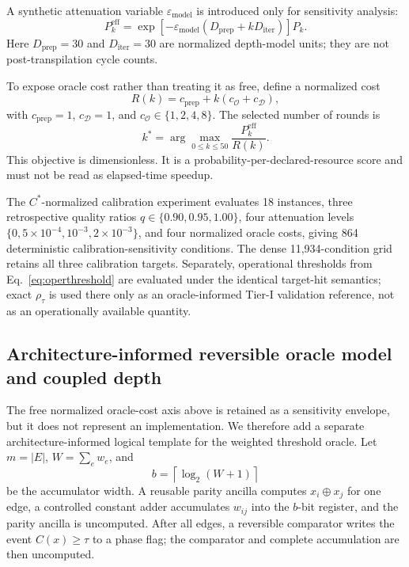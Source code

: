 \documentclass[5p,times]{elsarticle}
\begin{document}
A synthetic attenuation variable $\varepsilon_{\mathrm{model}}$ is introduced only for sensitivity analysis:
\begin{equation}
P_k^{\mathrm{eff}}=
\exp\left[-\varepsilon_{\mathrm{model}}(D_{\mathrm{prep}}+kD_{\mathrm{iter}})\right]P_k.
\end{equation}
Here $D_{\mathrm{prep}}=30$ and $D_{\mathrm{iter}}=30$ are normalized depth-model units; they are not post-transpilation cycle counts.

To expose oracle cost rather than treating it as free, define a normalized cost
\begin{equation}
R(k)=c_{\mathrm{prep}}+k(c_{\mathcal{O}}+c_{\mathcal{D}}),
\end{equation}
with $c_{\mathrm{prep}}=1$, $c_{\mathcal{D}}=1$, and $c_{\mathcal{O}}\in\{1,2,4,8\}$. The selected number of rounds is
\begin{equation}
k^*=\arg\max_{0\le k\le 50}
\frac{P_k^{\mathrm{eff}}}{R(k)}.
\label{eq:resourceobjective}
\end{equation}
This objective is dimensionless. It is a probability-per-declared-resource score and must not be read as elapsed-time speedup.

The $C^*$-normalized calibration experiment evaluates 18 instances, three retrospective quality ratios $q\in\{0.90,0.95,1.00\}$, four attenuation levels $\{0,5\times10^{-4},10^{-3},2\times10^{-3}\}$, and four normalized oracle costs, giving 864 deterministic calibration-sensitivity conditions. The dense 11,934-condition grid retains all three calibration targets. Separately, operational thresholds from Eq.~\eqref{eq:operthreshold} are evaluated under the identical target-hit semantics; exact $\rho_\tau$ is used there only as an oracle-informed Tier-I validation reference, not as an operationally available quantity.


\subsection{Architecture-informed reversible oracle model and coupled depth}
The free normalized oracle-cost axis above is retained as a sensitivity envelope, but it does not represent an implementation. We therefore add a separate architecture-informed logical template for the weighted threshold oracle. Let $m=|E|$, $W=\sum_e w_e$, and
\begin{equation}
b=\left\lceil\log_2(W+1)\right\rceil
\end{equation}
be the accumulator width. A reusable parity ancilla computes $x_i\oplus x_j$ for one edge, a controlled constant adder accumulates $w_{ij}$ into the $b$-bit register, and the parity ancilla is uncomputed. After all edges, a reversible comparator writes the event $C(x)\geq\tau$ to a phase flag; the comparator and complete accumulation are then uncomputed.
\end{document}
